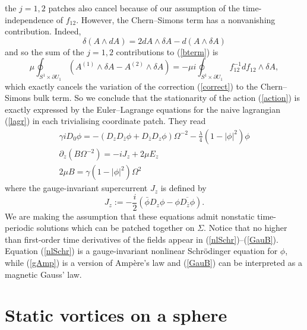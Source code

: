 \documentclass[a4paper,11pt]{article}
\begin{document}
the $j=1,2$ patches also cancel because of our assumption of the
time-independence of $f_{12}$. However, the Chern--Simons term has
a nonvanishing contribution. Indeed,
\[
\delta(A\wedge dA)=2dA\wedge \delta A-d(A\wedge \delta A)
\] 
and so the sum of the $j=1,2$ contributions to (\ref{bterm}) is
\[
\mu\oint_{S^{1}\times \partial U_{1}}
(A^{(1)}\wedge\delta A-A^{(2)}\wedge \delta A)=
-\mu i \oint_{S^{1}\times \partial U_{1}}f_{12}^{-1}df_{12}
\wedge\delta A,
\]
which exactly cancels the variation of the correction (\ref{correct})
to the Chern--Simons bulk term. So we conclude that the stationarity
of the action (\ref{action}) is exactly expressed by the
Euler--Lagrange equations for the naive lagrangian (\ref{lagr})
in each trivialising coordinate patch. They read
\begin{eqnarray}
&\gamma i D_{0}\phi=-(D_{z}D_{\bar{z}}\phi+D_{\bar{z}}D_{z}\phi)\Omega^{-2}-
\frac{\lambda}{4}\left(1-|\phi|^{2} \right) \phi & \label{nlSchr}\\
&\partial_{z}(B\Omega^{-2})=-iJ_{z}+2\mu E_{z} & \label{gAmp}\\
& 2\mu B=\gamma(1-|\phi|^{2})\Omega^{2} & \label{GauB}
\end{eqnarray}
where the gauge-invariant supercurrent $J_{z}$ is defined by
\begin{equation} \label{superc}
J_{z}:=-\frac{i}{2}\left(\bar{\phi}D_{z}\phi-
\phi \overline{D_{\bar{z}}\phi}\right).
\end{equation}
We are making the assumption that these equations admit nonstatic 
time-periodic solutions which can be patched together on $\Sigma$. 
Notice that no higher than first-order time derivatives of the fields 
appear in (\ref{nlSchr})--(\ref{GauB}).
Equation (\ref{nlSchr}) is a gauge-invariant nonlinear Schr\"odinger 
equation for $\phi$, while (\ref{gAmp}) is a version of Amp\`ere's law and 
(\ref{GauB}) can be interpreted as a magnetic Gauss' law.


\section{Static vortices on a sphere}
\end{document}
